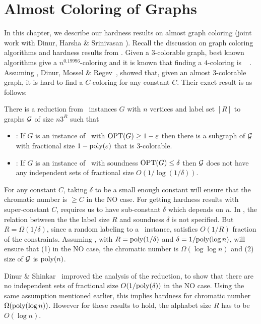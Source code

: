 
\chapter{Almost Coloring of Graphs} \label{ch:graph-hard} 

In this chapter, we describe our hardness results on almost
graph coloring (joint work with Dinur, Harsha \& Srinivasan \cite{DinurHSV2014}).
Recall the discussion
on graph coloring algorithms and hardness results from
. Given a $3$-colorable graph, best known algorithms
give a $n^{0.19996}$-coloring \cite{KawarabayashiT2014} and it is known that finding a $4$-coloring is
\NPHard~ \cite{GuruswamiK2004}. Assuming \UGC, Dinur, Mossel \& Regev~\cite{DinurMR2009}, showed that,
given an almost $3$-colorable graph, it is hard to find a $C$-coloring for any
constant $C$. Their exact result is as follows:

\begin{theorem}\label{thm:DMR} 
There
is a reduction from \UG\ instances $G$ with $n$ vertices and label set $[R]$ to
graphs $\cal G$ of size $n3^{R}$ such that 
\begin{itemize} 
\item \YES: If $G$ is an
instance of \UG\ with $\OPT(G)\geq 1-\epsilon$ then there is a subgraph
of $\cal G$ with fractional size $1-\poly(\epsilon)$ that is $3$-colorable.
\item \NO: If $G$ is an instance of \UG\ with soundness $\OPT(G) \leq \delta$ then $\cal G$
does not have any independent sets of fractional size $O(1/\log (1/\delta))$.
\end{itemize} 
\end{theorem} 

For any constant $C$, taking $\delta$ to be a small
enough constant will ensure that the chromatic number is $\geq C$ in the NO
case. For getting hardness results with super-constant $C$, requires us to have
sub-constant $\delta$ which depends on $n$. In \UGC, the relation between the
the label size $R$ and soundness $\delta$ is not specified. But $R =
\Omega(1/\delta)$, since a random labeling to a \UG\ instance, satisfies
$O(1/R)$ fraction of the constraints. Assuming \UGC, with $R = \poly(1/\delta)$
and $\delta = 1/\poly(\log n)$, will ensure that (1) in the NO case, the
chromatic number is $\Omega(\log \log n)$ and (2) size of $\calG$ is $\poly(n)$.

Dinur \& Shinkar~\cite{DinurS2010} improved the analysis of the reduction, to
show that there are no independent sets of fractional size $O(1/\poly(\delta))$
in the NO case. Using the same assumption mentioned earlier, this implies
hardness for chromatic number $\Omega(\poly(\log n))$. However for these
results to hold, the alphabet size $R$ has to be $O(\log n)$.

